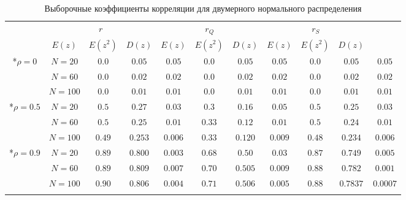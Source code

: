 \documentclass[12pt]{article}
\begin{document}
\begin{flushleft}
        \begin{table}[h]
            \begin{center}
                \caption{Выборочные коэффициенты корреляции для двумерного нормального распределения}
                \begin{tabular}{||c|c||*{3}{c|}|*{3}{c|}|*{3}{c|}|} \hhline{~~|t:===:t:===:t:===:t|}
                \multicolumn{2}{c||}{} & \multicolumn{3}{c||}{$r$} & \multicolumn{3}{c||}{$r_Q$} & \multicolumn{3}{c||}{$r_S$}\\ 
                \hhline{~~||---||---||---||}
                \multicolumn{2}{c||}{} & $E(z)$ & $E(z^2)$ & $D(z)$ & $E(z)$ & $E(z^2)$ & $D(z)$ & $E(z)$ & $E(z^2)$ & $D(z)$\\ 
                \hhline{|t:==::===::===::===:|}

                \multirow{3}*{$\rho = 0$} & $N = 20$ & $0.0$ & $0.05$ & $0.05$ & $0.0$ & $0.05$ & $0.05$ & $0.0$ & $0.05$ & $0.05$\\ 
                \hhline{~|-||---||---||---||}
                                            & $N = 60$ & $0.0$ & $0.02$ & $0.02$ & $0.0$ & $0.02$ & $0.02$ & $0.0$ & $0.02$ & $0.02$\\ 
                \hhline{~|-||---||---||---||}
                                            & $N = 100$ & $0.0$ & $0.01$ & $0.01$ & $0.0$ & $0.01$ & $0.01$ & $0.0$ & $0.01$ & $0.01$\\ 
                \hhline{|:=:=::===::===::===:|}

                \multirow{3}*{$\rho = 0.5$} & $N = 20$ & $0.5$ & $0.27$ & $0.03$ & $0.3$ & $0.16$ & $0.05$ & $0.5$ & $0.25$ & $0.03$\\
                \hhline{~|-||---||---||---||}
                                            & $N = 60$ & $0.5$ & $0.25$ & $0.01$ & $0.33$ & $0.12$ & $0.01$ & $0.5$ & $0.24$ & $0.01$\\
                \hhline{~|-||---||---||---||}
                                            & $N = 100$ & $0.49$ & $0.253$ & $0.006$ & $0.33$ & $0.120$ & $0.009$ & $0.48$ & $0.234$ & $0.006$\\ 
                \hhline{|:=:=::===::===::===:|}

                \multirow{3}*{$\rho = 0.9$} & $N = 20$ & $0.89$ & $0.800$ & $0.003$ & $0.68$ & $0.50$ & $0.03$ & $0.87$ & $0.749$ & $0.005$\\
                \hhline{~|-||---||---||---||}
                                            & $N = 60$ & $0.89$ & $0.809$ & $0.007$ & $0.70$ & $0.505$ & $0.009$ & $0.88$ & $0.782$ & $0.001$\\
                \hhline{~|-||---||---||---||}
                                            & $N = 100$ & $0.90$ & $0.806$ & $0.004$ & $0.71$ & $0.506$ & $0.005$ & $0.88$ & $0.7837$ & $0.0007$\\
                \hhline{|b:=:=:b:===:b:===:b:===:b|}
                \end{tabular}
            \label{table_normal}
            \end{center}
        \end{table}


\end{flushleft}
\end{document}
